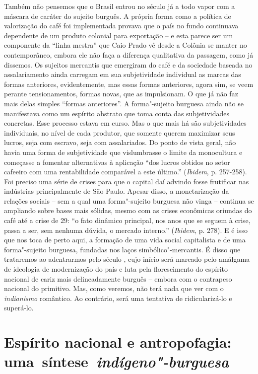 Também não pensemos que o Brasil entrou no século  já a todo vapor
com a máscara de caráter do sujeito burguês. A própria forma como a
política de valorização do café foi implementada provava que o país no
fundo continuava dependente de um produto colonial para exportação -- e
esta parece ser um componente da ``linha mestra'' que Caio Prado vê
desde a Colônia se manter no contemporâneo, embora ele não faça a
diferença qualitativa da passagem, como já dissemos. Os sujeitos
mercantis que emergiram do café e da sociedade baseada no assalariamento
ainda carregam em sua subjetividade individual as marcas das formas
anteriores, evidentemente, mas essas formas anteriores, agora sim, se
veem perante tensionamentos, formas novas, que as impulsionam. O que já
não faz mais delas simples ``formas anteriores''. A forma"-sujeito
burguesa ainda não se manifestava como um espírito abstrato que toma
conta das subjetividades concretas. Esse processo estava em curso. Mas o
que mais há são subjetividades individuais, no nível de cada produtor,
que somente querem maximizar seus lucros, seja com escravo, seja com
assalariados. Do ponto de vista geral, não havia uma forma de
subjetividade que vislumbrasse o limite da monocultura e começasse a
fomentar alternativas à aplicação ``dos lucros obtidos no setor cafeeiro
com uma rentabilidade comparável a este último.'' (\emph{Ibidem}, p.
257-258). Foi preciso uma série de crises para que o capital daí advindo
fosse frutificar nas indústrias principalmente de São Paulo. Apesar
disso, a monetarização da relações sociais -- sem a qual uma
forma"-sujeito burguesa não vinga -- continua se ampliando sobre bases
mais sólidas, mesmo com as crises econômicas oriundas do café até a
crise de 29: ``o fato dinâmico principal, nos anos que se seguem à
crise, passa a ser, sem nenhuma dúvida, o mercado interno.''
(\emph{Ibidem}, p. 278). E é isso que nos toca de perto aqui, a formação
de uma vida social capitalista e de uma forma"-sujeito burguesa, fundadas
nos laços simbólico"-mercantis. É disso que trataremos ao adentrarmos
pelo século , cujo início será marcado pelo amálgama de ideologia de
modernização do país e luta pela florescimento do espírito nacional de
cariz mais delineadamente burguês -- embora com o contrapeso nacional do
primitivo. Mas, como veremos, não terá nada que ver com o
\emph{indianismo} romântico. Ao contrário, será uma tentativa de
ridicularizá-lo e superá-lo.

\section*{Espírito nacional e antropofagia: uma~síntese~\emph{indígeno"-burguesa}}

